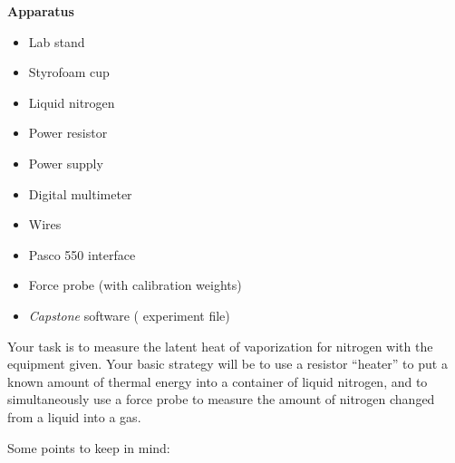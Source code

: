 \textbf{Apparatus}
\begin{itemize}
\item Lab stand
\item Styrofoam cup
\item Liquid nitrogen
\item Power resistor
\item Power supply
\item Digital multimeter
\item Wires
\item Pasco 550 interface
\item Force probe (with calibration weights)
\item \textit{Capstone} software ( experiment file)
\end{itemize}

Your task is to measure the latent heat of vaporization for nitrogen with the equipment given.
Your basic strategy will be to use a resistor ``heater'' to put a known amount of thermal
energy into a container of liquid nitrogen, and to simultaneously use a force probe to
measure the amount of nitrogen changed from a liquid into a gas.

Some points to keep in mind:

